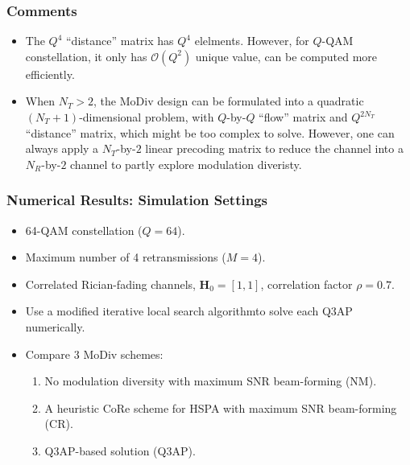 \documentclass{beamer}
\begin{document}
\begin{frame}
  \frametitle{Comments}
  
  \begin{itemize}
    \item The $Q^4$ ``distance'' matrix has $Q^4$ elelments. However, for
    $Q$-QAM constellation, it only has $\mathcal{O}(Q^2)$ unique value, can be
    computed more efficiently.
    \item When $N_T > 2$, the MoDiv design can be formulated into a quadratic
    $(N_T + 1)$-dimensional problem, with $Q$-by-$Q$ ``flow'' matrix and $Q ^
    {2N_T}$ ``distance'' matrix, which might be too complex to solve. However,
    one can always apply a $N_T$-by-$2$ linear precoding matrix to reduce the
    channel into a $N_R$-by-$2$ channel to partly explore modulation diveristy.
  \end{itemize}
\end{frame}


\begin{frame}
  \frametitle{Numerical Results: Simulation Settings}
  \begin{itemize}[<+->]
    \item 64-QAM constellation ($Q = 64$).
    \item Maximum number of 4 retransmissions ($M = 4$).
    \item Correlated Rician-fading channels, $\mathbf{H}_0 = [1, 1]$,
    correlation factor $\rho = 0.7$.
    \item Use a modified iterative local search algorithm\footnotemark to
    solve each Q3AP numerically.
    \item Compare 3 MoDiv schemes:
      \begin{enumerate}
        \item No modulation diversity with maximum SNR beam-forming (NM).
        \item A heuristic CoRe scheme for HSPA with maximum SNR
        beam-forming (CR).
        \item Q3AP-based solution (Q3AP).
      \end{enumerate}
  \end{itemize}
\end{frame}
\end{document}
